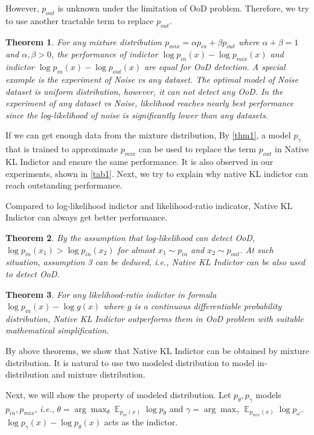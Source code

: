 \documentclass[letterpaper]{article} %
\newtheorem{theorem}{Theorem}
\newcommand{\IE}{\textit{i.e.}, }
\newcommand{\E}{\operatorname{\mathbb{E}}}
\newcommand{\pin}{p_{in}}
\newcommand{\pout}{p_{out}}
\newcommand{\pmix}{p_{mix}}
\begin{document}
However, $\pout$ is unknown under the limitation of OoD problem. Therefore, we try to use another tractable term to replace $\pout$. 

\begin{theorem}\label{thm2}
	For any mixture distribution $\pmix = \alpha \pin + \beta \pout$ where $\alpha + \beta = 1$ and $\alpha, \beta > 0$, the performance of indictor $\log \pin(x) - \log \pmix(x)$ and indictor $\log \pin(x) - \log \pout(x)$ are equal for OoD detection. A special example is the experiment of Noise vs any dataset. The optimal model of Noise dataset is uniform distribution, however, it can not detect any OoD. In the experiment of any dataset vs Noise, likelihood reaches nearly best performance since the log-likelihood of noise is significantly lower than any datasets. 
\end{theorem}

If we can get enough data from the mixture distribution, By \cref{thm1}, a model $p_\gamma$ that is trained to approximate $\pmix$ can be used to replace the term $\pout$ in Native KL Indictor and ensure the same performance. It is also observed in our experiments, shown in \cref{tab1}. Next, we try to explain why native KL indictor can reach outstanding performance.

Compared to log-likelihood indictor and likelihood-ratio indicator, Native KL Indictor can always get better performance. 
\begin{theorem}\label{thm3}
By the assumption that log-likelihood can detect OoD, $\log \pin(x_1) > \log \pin(x_2)$ for almost $x_1 \sim \pin$ and $x_2 \sim \pout$. At such situation, assumption 3 can be deduced, \IE Native KL Indictor can be also used to detect OoD. 
\end{theorem}

\begin{theorem}\label{thm4}
For any likelihood-ratio indictor in formula $\log \pin(x) - \log g(x)$ where $g$ is a continuous differentiable probability distribution, Native KL Indictor outperforms them in OoD problem with suitable mathematical simplification. 
\end{theorem}

By above theorems, we show that Native KL Indictor can be obtained by mixture distribution. It is natural to use two modeled distribution to model in-distribution and mixture distribution. 

Next, we will show the property of modeled distribution. Let $p_\theta, p_\gamma$ models $\pin, \pmix$, \IE $\theta = \arg \max_\theta \E_{\pin(x)} \log p_\theta$ and $\gamma = \arg \max_\gamma \E_{\pmix(x)} \log p_\omega$. $\log p_\gamma(x) - \log p_\theta(x)$ acts as the indictor. 
\end{document}
